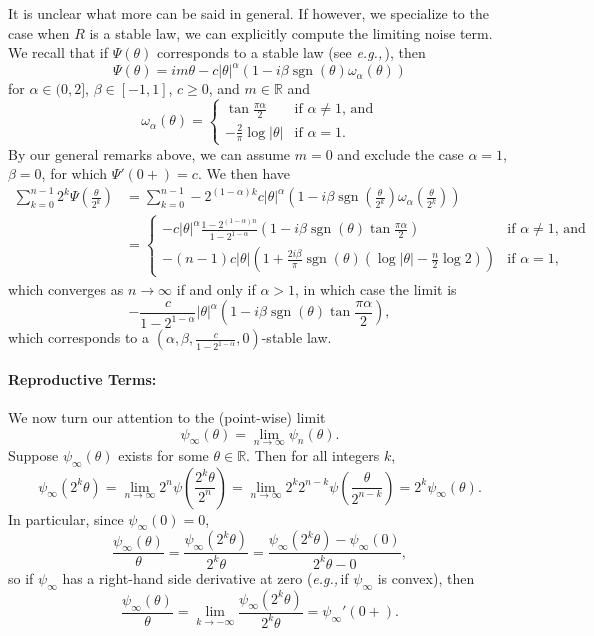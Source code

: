 \documentclass{article}
\newcommand{\eg}{\textit{e.g.,}\,}
\newcommand{\1}{\mathbbm{1}}
\DeclareMathOperator*{\sgn}{sgn}
\theoremstyle{remark}
\theoremstyle{definition}
\begin{document}
It is unclear what more can be said in general. If however, we specialize to the case when $R$ is a stable law, we can explicitly compute the limiting noise term.  We recall that if $\Psi(\theta)$ corresponds to a stable law (see \eg \cite{breiman1992probability}), then
\[
	\Psi(\theta) = im\theta - c|\theta|^{\alpha} (1-i\beta \sgn(\theta)\omega_{\alpha}(\theta))
\]
for $\alpha \in (0,2]$, $\beta \in [-1,1]$, $c \geq 0$, and $m \in \mathbb{R}$ and
\[
	\omega_{\alpha}(\theta) = \begin{cases}
		\tan{\frac{\pi\alpha}{2}} & \text{if $\alpha \neq 1$, and}\\
		-\frac{2}{\pi}\log{|\theta|} & \text{if $\alpha = 1$.}
	\end{cases}
\]
By our general remarks above, we can assume $m = 0$ and exclude the case $\alpha = 1$, $\beta = 0$, for which  $\Psi'(0+) = c$. We then have
\begin{align*}
	 \sum_{k=0}^{n-1}  {\textstyle 2^{k} \Psi\left(\frac{\theta}{2^{k}}\right)}
	 &=  \sum_{k=0}^{n-1} -2^{(1-\alpha)k} c|\theta|^{\alpha} {\textstyle\left(1-i \beta\sgn\left(\frac{\theta}{2^{k}}\right)
	 	 \omega_{\alpha}\left(\frac{\theta}{2^{k}}\right)\right)}\\
	&= \begin{cases}
		 -c|\theta|^{\alpha}\frac{1-2^{(1-\alpha)n}}{1-2^{1-\alpha}}\left(1-i\beta \sgn(\theta) \tan{\frac{\pi\alpha}{2}}\right) & \text{if $\alpha \neq 1$, and}\\	
         -(n-1) c|\theta| \left(1+\frac{2i\beta}{\pi}\sgn(\theta)\left(\log{|\theta|} - \frac{n}{2} \log{2}\right)\right) & \text{if $\alpha = 1$,}
	\end{cases}
\end{align*}
which converges as $n \to \infty$ if and only if $\alpha > 1$, in which case the limit is 
\begin{equation}\label{eq:stablenoises}
	 -\frac{c}{1-2^{1-\alpha}}|\theta|^{\alpha}\left(1-i\beta \sgn(\theta) \tan{\frac{\pi\alpha}{2}}\right), 
\end{equation}
which corresponds to a $\left(\alpha,\beta, \frac{c}{1-2^{1-\alpha}},0\right)$-stable law.

\paragraph{Reproductive Terms:}
We now turn our attention to the (point-wise) limit
\[
		\psi_{\infty}(\theta) = \lim_{n \to \infty} \psi_{n}(\theta).
\]
Suppose $\psi_{\infty}(\theta)$ exists for some $\theta \in \mathbb{R}$.  Then for all integers $k$, 
\[
	\psi_{\infty}(2^{k} \theta) = \lim_{n \to \infty} 2^{n}\psi\left(\frac{2^{k} \theta}{2^{n}}\right) =  \lim_{n \to \infty} 2^{k} 2^{n-k} \psi\left(\frac{\theta}{2^{n-k}}\right) 
	= 2^{k} \psi_{\infty}(\theta).
\]
In particular, since $\psi_{\infty}(0) = 0$, 
\[
	\frac{\psi_{\infty}(\theta)}{\theta} = \frac{\psi_{\infty}(2^{k} \theta)}{2^{k}\theta} = \frac{\psi_{\infty}(2^{k} \theta)-\psi_{\infty}(0)}{2^{k}\theta - 0}, 
\]
so if $\psi_{\infty}$ has a right-hand side derivative at zero (\eg if $\psi_{\infty}$ is convex), then
\[
	\frac{\psi_{\infty}(\theta)}{\theta} = \lim_{k \to -\infty} \frac{\psi_{\infty}(2^{k} \theta)}{2^{k}\theta} = \psi_{\infty}'(0+).
\]
\end{document}
